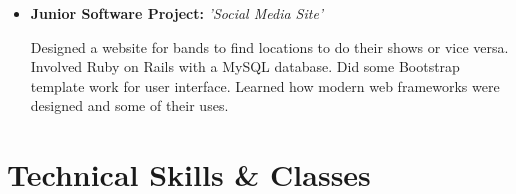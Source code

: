 \documentclass[11pt,a4paper,sans]{moderncv}        %
\begin{document}
\begin{itemize}
\vspace{3pt}

\item{\textbf{Junior Software Project:} \textit{'Social Media Site'}

\vspace{3pt}

\small{Designed a website for bands to find locations to do their shows or vice versa. Involved Ruby on Rails with a MySQL database. Did some Bootstrap template work for user interface. Learned how modern web frameworks were designed and some of their uses. }}

\vspace{3pt}

\end{itemize}

\section{Technical Skills \& Classes}

\vspace{3pt}
\end{document}
